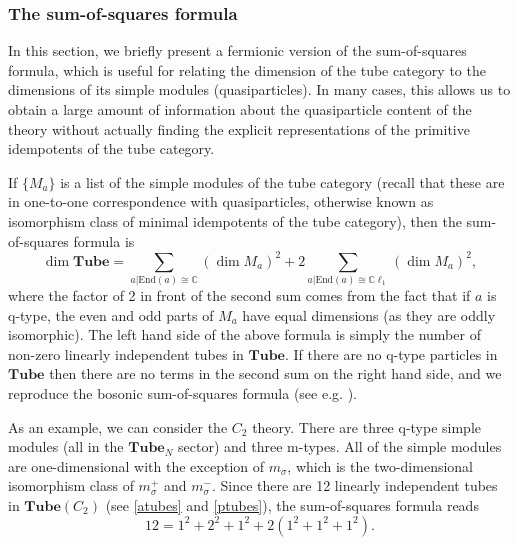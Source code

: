\documentclass[12pt,a4paper]{article}
\newcommand{\cc}{\mathbb{C}}
\newcommand\be            {\begin{equation}}
\newcommand\ee            {\end{equation}}
\newcommand{\End}{\text{End}}
\newcommand{\cl}{\mathbb{C}\ell}
\newcommand{\tube}{\textbf{Tube}}
\begin{document}


\subsubsection{The sum-of-squares formula}

In this section, we briefly present a fermionic version of the sum-of-squares formula, which is useful for relating the dimension
of the tube category to the dimensions of its simple modules (quasiparticles). 
In many cases, this allows us to obtain a large amount of information about the quasiparticle 
content of the theory without actually finding the explicit representations of the primitive 
idempotents of the tube category.

If $\{M_a\}$ is a list of the simple modules of the tube category 
(recall that these are in one-to-one correspondence with quasiparticles, otherwise known as isomorphism class of minimal idempotents of the tube category), then 
the sum-of-squares formula is
\be \label{sumofsqs} \dim \tube = \sum_{a | \End(a) \cong \cc} (\dim M_a)^2 + 2\sum_{a|\End(a) \cong \cl_1} (\dim M_a)^2,\ee
where the factor of 2 in front of the second sum comes from the fact that if $a$ is q-type, 
the even and odd parts of $M_a$ have equal dimensions (as they are oddly isomorphic). 
The left hand side of the above formula is simply the number of non-zero linearly independent tubes in $\tube$. 
If there are no q-type particles in $\tube$ then there are no terms in the second sum on the right hand side, 
and we reproduce the bosonic sum-of-squares formula (see e.g. \cite{Lan2014}). 

As an example, we can consider the $C_2$ theory. 
There are three q-type simple modules (all in the $\tube_N$ sector) and three m-types. 
All of the simple modules are one-dimensional with the exception of $m_\sigma$, 
which is the two-dimensional isomorphism class of $m_\sigma^+$ and $m_\sigma^-$. 
Since there are 12 linearly independent tubes in $\tube(C_2)$ (see \eqref{atubes} and \eqref{ptubes}), 
the sum-of-squares formula reads
\be 12 = 1^2+2^2+1^2+2(1^2+1^2+1^2).\ee
\end{document}
